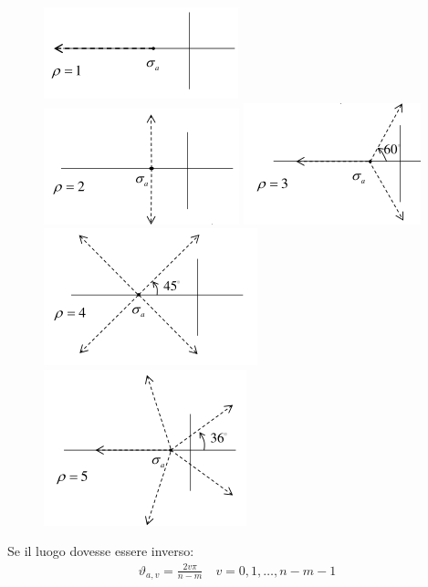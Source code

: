 \begin{figure}[h!]
  \centering
  \includegraphics[width=0.15\linewidth]{images/luogo_delle_radici_grado_relativo_1.png}
  \includegraphics[width=0.15\linewidth]{images/luogo_delle_radici_grado_relativo_2.png}
  \includegraphics[width=0.15\linewidth]{images/luogo_delle_radici_grado_relativo_3.png}
  \includegraphics[width=0.15\linewidth]{images/luogo_delle_radici_grado_relativo_4.png}
  \includegraphics[width=0.15\linewidth]{images/luogo_delle_radici_grado_relativo_5.png}
\end{figure}

Se il luogo dovesse essere inverso:
\begin{align}
  \vartheta_{a, v} = \frac{2v\pi}{n-m} \quad v = 0, 1, \dots, n-m-1
\end{align}


